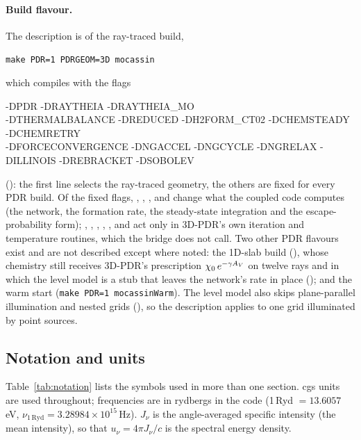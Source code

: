 \paragraph{Build flavour.} The description is of the ray-traced build,
\begin{center}\verb|make PDR=1 PDRGEOM=3D mocassin|\end{center}
which compiles with the flags
\begin{center}\small\ttfamily
-DPDR -DRAYTHEIA -DRAYTHEIA\_MO\\
-DTHERMALBALANCE -DREDUCED -DH2FORM\_CT02 -DCHEMSTEADY -DCHEMRETRY\\
-DFORCECONVERGENCE -DNGACCEL -DNGCYCLE -DNGRELAX -DILLINOIS -DREBRACKET -DSOBOLEV
\end{center}
(): the first line selects the ray-traced
geometry, the others are fixed for every PDR build. Of the fixed flags,
, , ,  and
 change what the coupled code computes (the network, the \Htwo{}
formation rate, the steady-state integration and the escape-probability
form); , , ,
, ,  and  act only in
3D-PDR's own iteration and temperature routines, which the bridge does not
call. Two other PDR flavours exist and are not
described except where noted: the 1D-slab build (),
whose chemistry still receives 3D-PDR's prescription
$\chi_0\,e^{-\gamma A_{V}}$ on twelve rays and in which the level model is a
stub that leaves the network's \Htwo{} rate in place
(); and the warm start
(\verb|make PDR=1 mocassinWarm|). The level model also skips plane-parallel
illumination and nested grids (), so the
description applies to one grid illuminated by point sources.

\subsection{Notation and units}

Table~\ref{tab:notation} lists the symbols used in more than one section.
cgs units are used throughout; frequencies are in rydbergs in the code
(1\,Ryd $=13.6057$\,eV, $\nu_{1\,\mathrm{Ryd}}=3.28984\times10^{15}$\,Hz).
$J_\nu$ is the angle-averaged specific intensity (the mean intensity), so that
$u_\nu=4\pi J_\nu/c$ is the spectral energy density.

